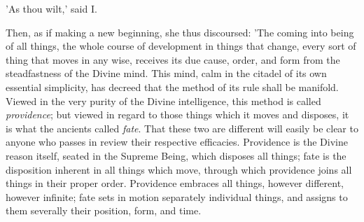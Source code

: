 'As thou wilt,' said I.

Then, as if making a new beginning, she thus discoursed: 'The coming
into being of all things, the whole course of development in things that
change, every sort of thing that moves in any wise, receives its due
cause, order, and form from the steadfastness of the Divine mind. This
mind, calm in the citadel of its own essential simplicity, has decreed
that the method of its rule shall be manifold. Viewed in the very purity
of the Divine intelligence, this method is called \emph{providence}; but
viewed in regard to those things which it moves and disposes, it is
what the ancients called \emph{fate}. That these two are different will
easily be clear to anyone who passes in review their respective
efficacies. Providence is the Divine reason itself, seated in the
Supreme Being, which disposes all things; fate is the disposition
inherent in all things which move, through which providence joins all
things in their proper order. Providence embraces all things, however
different, however infinite; fate sets in motion separately individual
things, and assigns to them severally their position, form, and time.

